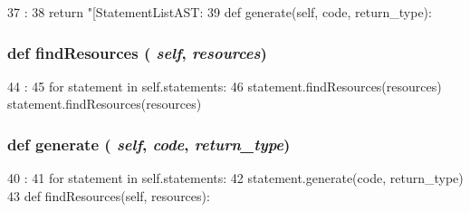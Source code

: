 \begin{DoxyCode}
37                       :
38         return "[StatementListAST: %
39 
    def generate(self, code, return_type):
\end{DoxyCode}
\hypertarget{classslicc_1_1ast_1_1StatementListAST_1_1StatementListAST_abd195c795639b490ba2de4c1246105f1}{
\subsubsection[{findResources}]{\setlength{\rightskip}{0pt plus 5cm}def findResources ( {\em self}, \/   {\em resources})}}
\label{classslicc_1_1ast_1_1StatementListAST_1_1StatementListAST_abd195c795639b490ba2de4c1246105f1}



\begin{DoxyCode}
44                                       :
45         for statement in self.statements:
46             statement.findResources(resources)
            statement.findResources(resources)
\end{DoxyCode}
\hypertarget{classslicc_1_1ast_1_1StatementListAST_1_1StatementListAST_a4555d1cee0dccf3942ea35fe86de2e8e}{
\subsubsection[{generate}]{\setlength{\rightskip}{0pt plus 5cm}def generate ( {\em self}, \/   {\em code}, \/   {\em return\_\-type})}}
\label{classslicc_1_1ast_1_1StatementListAST_1_1StatementListAST_a4555d1cee0dccf3942ea35fe86de2e8e}



\begin{DoxyCode}
40                                          :
41         for statement in self.statements:
42             statement.generate(code, return_type)
43 
    def findResources(self, resources):
\end{DoxyCode}


